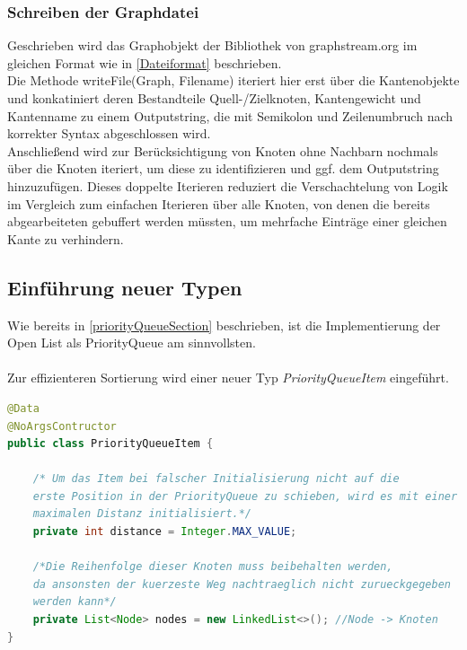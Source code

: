 \documentclass[a4paper]{article}
\begin{document}
\subsubsection{Schreiben der Graphdatei}
Geschrieben wird das Graphobjekt der Bibliothek von graphstream.org im gleichen Format wie in \ref{Dateiformat} beschrieben.\\
Die Methode writeFile(Graph, Filename) iteriert hier erst über die Kantenobjekte und konkatiniert deren Bestandteile Quell-/Zielknoten, Kantengewicht und Kantenname zu einem Outputstring, die mit Semikolon und Zeilenumbruch nach korrekter Syntax abgeschlossen wird.\\
Anschließend wird zur Berücksichtigung von Knoten ohne Nachbarn nochmals über die Knoten iteriert, um diese zu identifizieren und ggf. dem Outputstring hinzuzufügen. Dieses doppelte Iterieren reduziert die Verschachtelung von Logik im Vergleich zum einfachen Iterieren über alle Knoten, von denen die bereits abgearbeiteten gebuffert werden müssten, um mehrfache Einträge einer gleichen
Kante zu verhindern.\\
		

\subsection{Einführung neuer Typen}

Wie bereits in \ref{priorityQueueSection} beschrieben, ist die Implementierung der Open List als PriorityQueue am sinnvollsten.\\\\
Zur effizienteren Sortierung wird einer neuer Typ \textit{PriorityQueueItem} eingeführt.\\

\begin{lstlisting}[language = java, frame = trBL]
@Data
@NoArgsContructor
public class PriorityQueueItem {

    /* Um das Item bei falscher Initialisierung nicht auf die
    erste Position in der PriorityQueue zu schieben, wird es mit einer
    maximalen Distanz initialisiert.*/
    private int distance = Integer.MAX_VALUE; 

    /*Die Reihenfolge dieser Knoten muss beibehalten werden,
    da ansonsten der kuerzeste Weg nachtraeglich nicht zurueckgegeben
    werden kann*/
    private List<Node> nodes = new LinkedList<>(); //Node -> Knoten
}
\end{lstlisting}

\newpage
\end{document}
